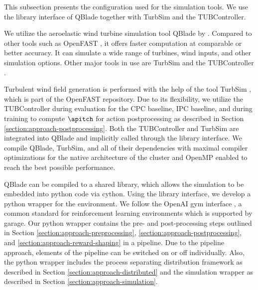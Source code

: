 \begin{summary}
This subsection presents the configuration used for the simulation tools. We use the library interface of QBlade together with TurbSim and the TUBController. 
\end{summary}

We utilize the aeroelastic wind turbine simulation tool QBlade by \citet{martenQBladeModernTool2020}. Compared to other tools such as OpenFAST \cite{buhlOpenFAST}, it offers faster computation at comparable or better accuracy. It can simulate a wide range of turbines, wind inputs, and other simulation options. Other major tools in use are TurbSim \cite{neilkelleyandbonniejonkmanTurbSim} and the TUBController \cite{perez-beckerImplementationValidationAdvanced2021}.

Turbulent wind field generation is performed with the help of the tool TurbSim \cite{neilkelleyandbonniejonkmanTurbSim}, which is part of the OpenFAST repository. Due to its flexibility, we utilize the TUBController \cite{perez-beckerImplementationValidationAdvanced2021} during evaluation for the \ac{CPC} baseline, \ac{IPC} baseline, and during training to compute $\apitch$ for action postprocessing as described in Section \ref{section:approach-postprocessing}. Both the TUBController and TurbSim are integrated into QBlade and implicitly called through the library interface. We compile QBlade, TurbSim, and all of their dependencies with maximal compiler optimizations for the native architecture of the cluster and OpenMP enabled to reach the best possible performance.

QBlade can be compiled to a shared library, which allows the simulation to be embedded into python code via cython. Using the library interface, we develop a python wrapper for the environment. We follow the OpenAI gym interface \cite{brockmanOpenAIGym2016}, a common standard for reinforcement learning environments which is supported by garage. Our python wrapper contains the pre- and post-processing steps outlined in Section \ref{section:approach-preprocessing}, \ref{section:approach-postprocessing}, and \ref{section:approach-reward-shaping} in a pipeline. Due to the pipeline approach, elements of the pipeline can be switched on or off individually. Also, the python wrapper includes the process separating distribution framework as described in Section \ref{section:approach-distributed} and the simulation wrapper as described in Section \ref{section:approach-simulation}.

